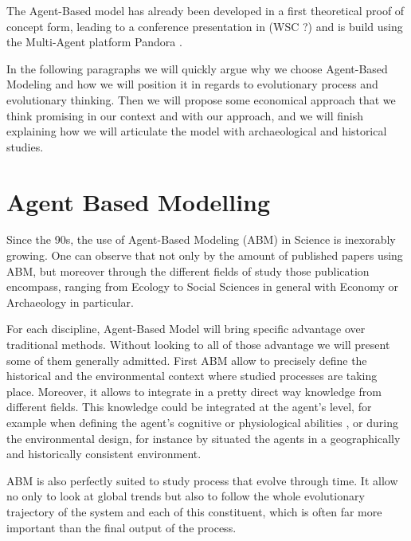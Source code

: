\documentclass[a4paper]{article}
\begin{document}
The Agent-Based model has already been developed in a first theoretical proof of concept form, leading to a conference presentation in (WSC ?) and is build using the Multi-Agent platform Pandora \citep{rubio2014pandora}.

In the following paragraphs we will quickly argue why we choose Agent-Based Modeling and how we will position it in regards to evolutionary process and evolutionary thinking. Then we will propose some economical approach that we think promising in our context and with our approach, and we will finish explaining how we will articulate the model with archaeological and historical studies.


\section{Agent Based Modelling}
Since the 90s, the use of Agent-Based Modeling (ABM) in Science is inexorably growing. One can observe that not only by the amount of published papers using ABM, but moreover through the different fields of study those publication encompass, ranging from Ecology \citep{grimm2005individual} to Social Sciences in general \citep{epstein1996growingartificialsocietiessocialsciencefromthebottomup} with Economy \citep{tesfatsion2006agentbasedcomputationaleconomicsaconstructiveapproachtoeconomictheory} or Archaeology \citep{wurzer2015agentbasedmodelingandsimulationinarchaeology} in particular.

For each discipline, Agent-Based Model will bring specific advantage over traditional methods. Without looking to all of those advantage we will present some of them generally admitted. First ABM allow to precisely define the historical and the environmental context where studied processes are taking place. Moreover, it allows to integrate in a pretty direct way knowledge from different fields. This knowledge could be integrated at the agent's level, for example when defining the agent's cognitive or physiological abilities \citep{chen2012varietiesofagentsinagentbasedcomputationaleconomicsahistoricalandaninterdisciplinaryperspective}, or during the environmental design, for instance by situated the agents in a geographically and historically consistent environment.

ABM is also perfectly suited to study process that evolve through time. It allow no only to look at global trends but also to follow the whole evolutionary trajectory of the system and each of this constituent, which is often far more important than the final output of the process.
\end{document}
